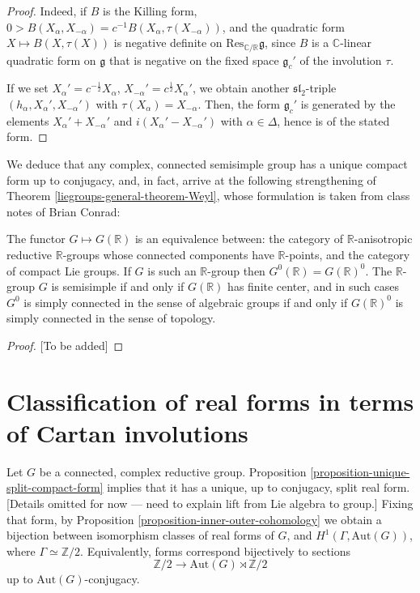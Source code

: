 \begin{proof}
 Indeed, if $B$ is the Killing form, $0 > B(X_\alpha, X_{-\alpha}) = c^{-1} B(X_\alpha, \tau(X_{-\alpha}))$, and the quadratic form $X\mapsto B(X,\tau(X))$ is negative definite on $\text{Res}_{\mathbb C/\mathbb R} \mathfrak g$, since $B$ is a $\mathbb C$-linear quadratic form on $\mathfrak g$ that is negative on the fixed space $\mathfrak g_c'$ of the involution $\tau$. 
 
 If we set $X_\alpha' = c^{-\frac{1}{2}} X_\alpha$, $X_{-\alpha}' = c^{\frac{1}{2}} X_\alpha'$, we obtain another $\mathfrak{sl}_2$-triple $(h_\alpha, X_\alpha', X_{-\alpha}')$ with $\tau(X_\alpha) = X_{-\alpha}$.  Then, the form $\mathfrak g_c'$ is generated by the elements $X_\alpha'+X_{-\alpha}'$ and $i(X_\alpha' -X_{-\alpha}')$ with $\alpha\in \Delta$, hence is of the stated form. 
\end{proof}


We deduce that any complex, connected semisimple group has a unique compact form up to conjugacy, and, in fact, arrive at the following strengthening of Theorem \ref{liegroups-general-theorem-Weyl}, whose formulation is taken from class notes of Brian Conrad:


\begin{theorem}
\label{theorem-functor-compactgroups}
 The functor $G\mapsto G(\mathbb R)$ is an equivalence between: the category of $\mathbb R$-anisotropic reductive $\mathbb R$-groups whose connected components have $\mathbb R$-points, and the category of compact Lie groups. If $G$ is such an $\mathbb R$-group then $G^0(\mathbb R)=G(\mathbb R)^0$. The $\mathbb R$-group $G$ is semisimple if and only if $G(\mathbb R)$ has finite center, and in such cases $G^0$ is simply connected in the sense of algebraic groups if and only if $G(\mathbb R)^0$ is simply connected in the sense of topology.
\end{theorem}


\begin{proof}

 [To be added]
\end{proof}



\section{Classification of real forms in terms of Cartan involutions}
\label{section-real-Cartan}

Let $G$ be a connected, complex reductive group. Proposition \ref{proposition-unique-split-compact-form} implies that it has a unique, up to conjugacy, split real form. [Details omitted for now --- need to explain lift from Lie algebra to group.] Fixing that form, by Proposition \ref{proposition-inner-outer-cohomology} we obtain a bijection between isomorphism classes of real forms of $G$, and $H^1(\Gamma, \text{Aut}(G))$, where $\Gamma \simeq \mathbb Z/2$. Equivalently, forms correspond bijectively to sections
$$ \mathbb Z/2 \to \text{Aut}(G) \rtimes \mathbb Z/2$$
up to $\text{Aut}(G)$-conjugacy. 

